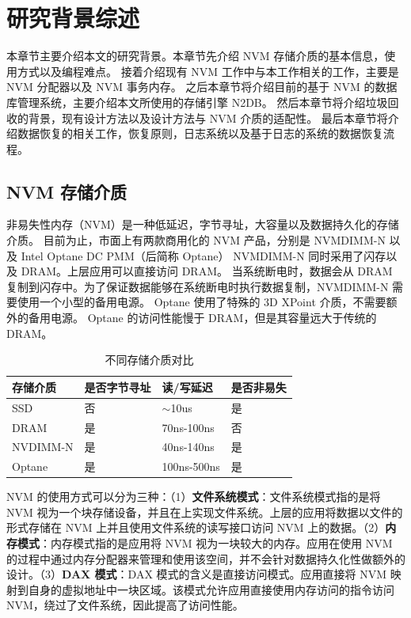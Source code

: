
\chapter{研究背景综述}

本章节主要介绍本文的研究背景。本章节先介绍 NVM 存储介质的基本信息，使用方式以及编程难点。
接着介绍现有 NVM 工作中与本工作相关的工作，主要是 NVM 分配器以及 NVM 事务内存。
之后本章节将介绍目前的基于 NVM 的数据库管理系统，主要介绍本文所使用的存储引擎 N2DB。
然后本章节将介绍垃圾回收的背景，现有设计方法以及设计方法与 NVM 介质的适配性。
最后本章节将介绍数据恢复的相关工作，恢复原则，日志系统以及基于日志的系统的数据恢复流程。

\section{NVM 存储介质}

非易失性内存（NVM）是一种低延迟，字节寻址，大容量以及数据持久化的存储介质。
目前为止，市面上有两款商用化的 NVM 产品，分别是 NVMDIMM-N 以及 Intel Optane DC PMM（后简称 Optane）
NVMDIMM-N 同时采用了闪存以及 DRAM。上层应用可以直接访问 DRAM。
当系统断电时，数据会从 DRAM 复制到闪存中。为了保证数据能够在系统断电时执行数据复制，NVMDIMM-N 需要使用一个小型的备用电源。
Optane 使用了特殊的 3D XPoint 介质，不需要额外的备用电源。
Optane 的访问性能慢于 DRAM，但是其容量远大于传统的 DRAM。

\begin{table}
    \centering
    \caption{不同存储介质对比}
    \begin{tabular}{llll}
        \toprule
        存储介质 & 是否字节寻址 & 读/写延迟    & 是否非易失 \\
        \midrule
        SSD      & 否           & $ \sim $10us & 是         \\
        DRAM     & 是           & 70ns-100ns   & 否         \\
        NVDIMM-N & 是           & 40ns-140ns   & 是         \\
        Optane   & 是           & 100ns-500ns  & 是         \\
        \bottomrule
    \end{tabular}
    \label{tab:nvm}
\end{table}

NVM 的使用方式可以分为三种：（1）\textbf{文件系统模式}：文件系统模式指的是将 NVM 视为一个块存储设备，并且在上实现文件系统。上层的应用将数据以文件的形式存储在 NVM 上并且使用文件系统的读写接口访问 NVM 上的数据。（2）\textbf{内存模式}：内存模式指的是应用将 NVM 视为一块较大的内存。应用在使用 NVM 的过程中通过内存分配器来管理和使用该空间，并不会针对数据持久化性做额外的设计。（3）\textbf{DAX 模式}：DAX 模式的含义是直接访问模式。应用直接将 NVM 映射到自身的虚拟地址中一块区域。该模式允许应用直接使用内存访问的指令访问 NVM，绕过了文件系统，因此提高了访问性能。

